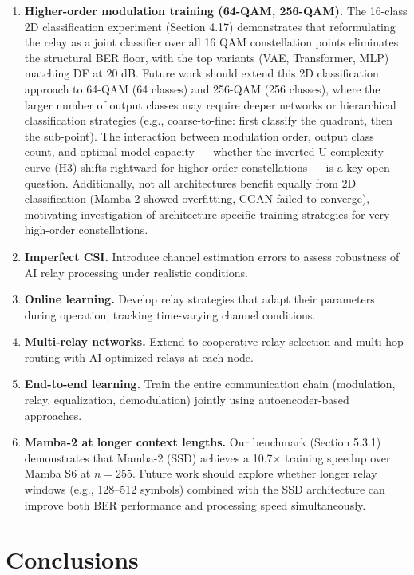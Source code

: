 \documentclass[
  english,
  12pt,
  12pt,
  a4paper,
  oneside]{report}
\begin{document}
\begin{enumerate}
\def\labelenumi{\arabic{enumi}.}
\item
  \textbf{Higher-order modulation training (64-QAM, 256-QAM).} The 16-class 2D classification experiment (Section 4.17) demonstrates that reformulating the relay as a joint classifier over all 16 QAM constellation points eliminates the structural BER floor, with the top variants (VAE, Transformer, MLP) matching DF at 20 dB. Future work should extend this 2D classification approach to 64-QAM (64 classes) and 256-QAM (256 classes), where the larger number of output classes may require deeper networks or hierarchical classification strategies (e.g., coarse-to-fine: first classify the quadrant, then the sub-point). The interaction between modulation order, output class count, and optimal model capacity --- whether the inverted-U complexity curve (H3) shifts rightward for higher-order constellations --- is a key open question. Additionally, not all architectures benefit equally from 2D classification (Mamba-2 showed overfitting, CGAN failed to converge), motivating investigation of architecture-specific training strategies for very high-order constellations.
\item
  \textbf{Imperfect CSI.} Introduce channel estimation errors to assess robustness of AI relay processing under realistic conditions.
\item
  \textbf{Online learning.} Develop relay strategies that adapt their parameters during operation, tracking time-varying channel conditions.
\item
  \textbf{Multi-relay networks.} Extend to cooperative relay selection and multi-hop routing with AI-optimized relays at each node.
\item
  \textbf{End-to-end learning.} Train the entire communication chain (modulation, relay, equalization, demodulation) jointly using autoencoder-based approaches.
\item
  \textbf{Mamba-2 at longer context lengths.} Our benchmark (Section 5.3.1) demonstrates that Mamba-2 (SSD) achieves a 10.7× training speedup over Mamba S6 at \(n = 255\). Future work should explore whether longer relay windows (e.g., 128--512 symbols) combined with the SSD architecture can improve both BER performance and processing speed simultaneously.
\end{enumerate}

\section{Conclusions}\label{sec:conclusions}
\end{document}
